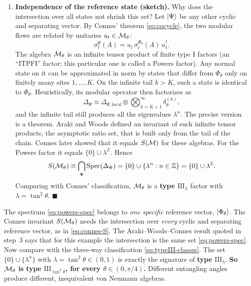 \begin{keyresult}
\begin{enumerate}[leftmargin=*]
\item \textbf{Independence of the reference state (sketch).}
Why does the intersection over all states not shrink this set? Let $\ket\Psi$ be any other cyclic and
separating vector. By Connes' theorem \eqref{eq:cocycle}, the two modular flows are related by unitaries
$u_t\in\mathcal{M}_\theta$:
\[
\sigma_t^\Psi(A) = u_t \,\sigma_t^{\Phi_\theta}(A)\, u_t^\dagger .
\]
The algebra $\mathcal{M}_\theta$ is an infinite tensor product of finite type I factors (an ``ITPFI'' factor; this
particular one is called a Powers factor). Any normal state on it can be approximated in norm by states that
differ from $\Phi_\theta$ only on finitely many sites $1, \dots, K$. On the infinite tail $k > K$, such a state
is identical to $\Phi_\theta$. Heuristically, its modular operator then factorizes as
\[
\Delta_\Psi \approx \Delta_{\Psi,\text{local}} \otimes \bigotimes_{k=K+1}^\infty \delta_\theta^{(k)} ,
\]
and the infinite tail still produces all the eigenvalues $\lambda^n$. The precise version is a theorem.
Araki and Woods defined an invariant of such infinite tensor products, the asymptotic ratio set, that is built
only from the tail of the chain. Connes later showed that it equals $S(\mathcal{M})$ for these algebras. For the Powers
factor it equals $\{0\}\cup\lambda^{\mathbb Z}$. Hence
\[
S(\mathcal{M}_\theta) \equiv \bigcap_{\Psi} \mathrm{Spec}(\Delta_\Psi) = \{0\} \cup \{\lambda^n : n \in \mathbb{Z}\}
= \{0\} \cup \lambda^{\mathbb{Z}} .
\]
Comparing with Connes' classification, $\mathcal{M}_\theta$ is a \textbf{type $\mathrm{III}_\lambda$} factor with
$\lambda = \tan^2\theta$. $\blacksquare$
\end{enumerate}
\end{keyresult}

The spectrum \eqref{eq:powers-spec} belongs to \emph{one specific} reference vector, $\ket{\Phi_\theta}$. The
Connes invariant $S(\mathcal{M}_\theta)$ needs the intersection over \emph{every} cyclic and separating reference
vector, as in \eqref{eq:connes-S}. The Araki--Woods--Connes result quoted in step~3 says that for this example
the intersection is the same set \eqref{eq:powers-spec}. Now compare with the three-way classification
\eqref{eq:typeIII-classes}. The set $\{0\}\cup\{\lambda^n\}$ with $\lambda=\tan^2\theta\in(0,1)$ is exactly the
signature of \textbf{type $\mathrm{III}_\lambda$}. \textbf{So $\mathcal{M}_\theta$ is type $\mathrm{III}_{\tan^2\theta}$,
for every $\theta\in(0,\pi/4)$.} Different entangling angles produce different, inequivalent von Neumann
algebras.

